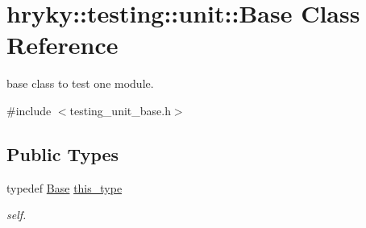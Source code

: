 \hypertarget{classhryky_1_1testing_1_1unit_1_1_base}{\section{hryky\-:\-:testing\-:\-:unit\-:\-:Base Class Reference}
\label{classhryky_1_1testing_1_1unit_1_1_base}
}


base class to test one module.  




{\ttfamily \#include $<$testing\-\_\-unit\-\_\-base.\-h$>$}

\subsection*{Public Types}
\begin{DoxyCompactItemize}
\item 
\hypertarget{classhryky_1_1testing_1_1unit_1_1_base_a5424efb7b586101378315945147e85ef}{typedef \hyperlink{classhryky_1_1testing_1_1unit_1_1_base}{Base} \hyperlink{classhryky_1_1testing_1_1unit_1_1_base_a5424efb7b586101378315945147e85ef}{this\-\_\-type}}\label{classhryky_1_1testing_1_1unit_1_1_base_a5424efb7b586101378315945147e85ef}

\begin{DoxyCompactList}\small\item\em self. \end{DoxyCompactList}\end{DoxyCompactItemize}
